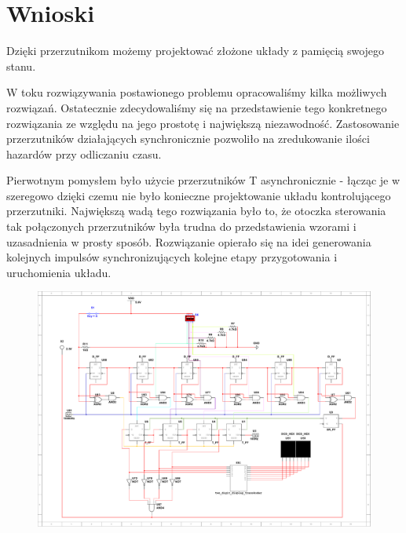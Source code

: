 \documentclass[a4paper]{article}
\begin{document}
\pagebreak
\section{Wnioski}
Dzięki przerzutnikom możemy projektować złożone układy z pamięcią swojego stanu. 

W toku rozwiązywania postawionego problemu opracowaliśmy kilka możliwych rozwiązań. Ostatecznie
zdecydowaliśmy się na przedstawienie tego konkretnego rozwiązania ze względu na jego prostotę i 
największą niezawodność. Zastosowanie przerzutników działających synchronicznie pozwoliło na zredukowanie
ilości hazardów przy odliczaniu czasu.

Pierwotnym pomysłem było użycie przerzutników T asynchronicznie - łącząc je w szeregowo dzięki czemu 
nie było konieczne projektowanie układu kontrolującego przerzutniki. Największą wadą tego rozwiązania
było to, że otoczka sterowania tak połączonych przerzutników była trudna do przedstawienia wzorami i 
uzasadnienia w prosty sposób. Rozwiązanie opierało się na idei generowania kolejnych impulsów 
synchronizujących kolejne etapy przygotowania i uruchomienia układu.

\begin{figure}[H]
    \centering
    \includegraphics[width=\textwidth]{lab2_1.pdf}
\end{figure}
\pagebreak
\end{document}
